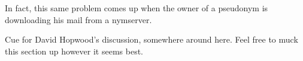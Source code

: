 \documentclass{llncs}
\renewcommand\url{\begingroup \def\UrlLeft{<}\def\UrlRight{>}\urlstyle{tt}\Url}
\begin{document}
In fact, this same problem comes up when the owner of a pseudonym is
downloading his mail from a nymserver.

Cue for David Hopwood's discussion, somewhere around here. Feel free
to muck this section up however it seems best.



%
%
%
%
%
%
%
%
\end{document}
